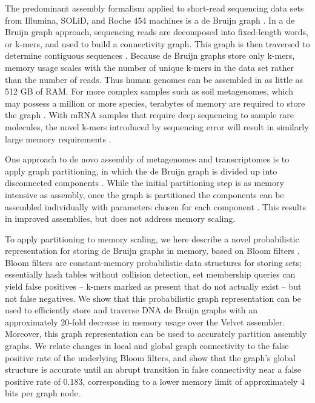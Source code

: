\documentclass[12pt]{article} \usepackage{simplemargins}
\begin{document}
The predominant assembly formalism applied to short-read sequencing
data sets from Illumina, SOLiD, and Roche 454 machines is a de Bruijn
graph \cite{pubmed20211242,pubmed22068540}.  In a de Bruijn graph approach, sequencing reads are decomposed
into fixed-length words, or k-mers, and used to build a connectivity
graph.  This graph is then traversed to determine contiguous sequences
\cite{pubmed22068540}.  Because de Bruijn graphs store only
k-mers, memory usage scales with the number of unique k-mers in the
data set rather than the number of reads.  Thus human genomes can be
assembled in as little as 512 GB of RAM\cite{pmid21187386}.  For
more complex samples such as soil metagenomes, which may possess a
million or more species, terabytes of memory are required to store the
graph \cite{pubmed21304727}.  With mRNA samples that require deep sequencing to sample rare
molecules, the novel k-mers introduced by sequencing error will result in
similarly large memory requirements \cite{trinity}.

One approach to de novo assembly of metagenomes and transcriptomes is
to apply graph partitioning, in which the de Bruijn graph is divided
up into disconnected components \cite{trinity, metavelvet,pubmed21685107}.
While the initial partitioning step is as memory
intensive as assembly, once the graph is partitioned the components
can be assembled individually with parameters chosen for each
component \cite{metavelvet,pubmed21685107}.  This results in improved assemblies, but does not
address memory scaling.

To apply partitioning to memory scaling, we here describe a novel
probabilistic representation for storing de Bruijn graphs in memory,
based on Bloom filters \cite{bloom}.  Bloom filters are constant-memory
probabilistic data structures for storing sets; essentially hash
tables without collision detection, set membership queries can yield
false positives -- k-mers marked as present that do not actually exist --
but not false negatives.  We show that this
probabilistic graph representation can be used to efficiently store
and traverse DNA de Bruijn graphs with an approximately 20-fold
decrease in memory usage over the Velvet assembler. Moreover, this
graph representation can be used to accurately partition assembly
graphs.  We relate changes in local and global graph connectivity
to the false positive rate of the underlying Bloom filters, and
show that the graph's global structure is accurate until an abrupt
transition in false connectivity near a false positive rate of 0.183,
corresponding to a lower memory limit of approximately 4 bits per graph node.
\end{document}
